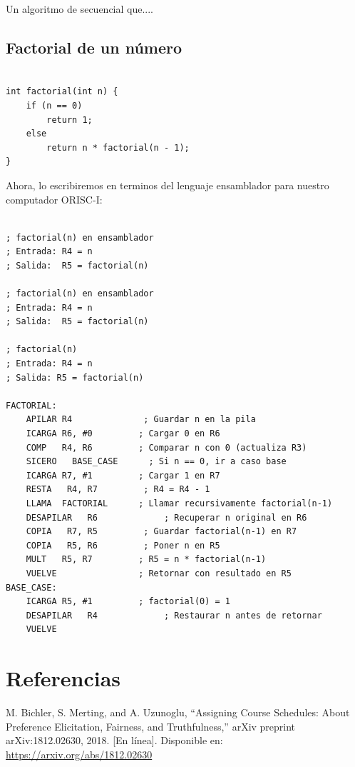 \documentclass{article}
\begin{document}
Un algoritmo de secuencial que....

\subsection{Factorial de un número}


\begin{verbatim}

int factorial(int n) {
    if (n == 0)
        return 1;
    else
        return n * factorial(n - 1);
}
\end{verbatim}
Ahora, lo escribiremos en terminos del lenguaje ensamblador para nuestro computador ORISC-I:

\begin{verbatim}

; factorial(n) en ensamblador
; Entrada: R4 = n
; Salida:  R5 = factorial(n)

; factorial(n) en ensamblador
; Entrada: R4 = n
; Salida:  R5 = factorial(n)

; factorial(n)
; Entrada: R4 = n
; Salida: R5 = factorial(n)

FACTORIAL:
    APILAR R4              ; Guardar n en la pila
    ICARGA R6, #0         ; Cargar 0 en R6
    COMP   R4, R6         ; Comparar n con 0 (actualiza R3)
    SICERO   BASE_CASE      ; Si n == 0, ir a caso base
    ICARGA R7, #1         ; Cargar 1 en R7
    RESTA   R4, R7         ; R4 = R4 - 1
    LLAMA  FACTORIAL      ; Llamar recursivamente factorial(n-1)
    DESAPILAR   R6             ; Recuperar n original en R6
    COPIA   R7, R5         ; Guardar factorial(n-1) en R7
    COPIA   R5, R6         ; Poner n en R5
    MULT   R5, R7         ; R5 = n * factorial(n-1)
    VUELVE                ; Retornar con resultado en R5
BASE_CASE:
    ICARGA R5, #1         ; factorial(0) = 1
    DESAPILAR   R4             ; Restaurar n antes de retornar
    VUELVE

\end{verbatim}



\section{Referencias}
\renewcommand{\refname}{}

\begin{thebibliography}{9}

   \label{ref:BPS} M. Bichler, S. Merting, and A. Uzunoglu,
  “Assigning Course Schedules: About Preference Elicitation, Fairness, and Truthfulness,”
  arXiv preprint arXiv:1812.02630, 2018. [En línea]. Disponible en:
  \url{https://arxiv.org/abs/1812.02630}


\end{thebibliography}
\end{document}
